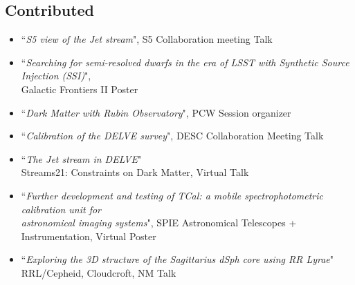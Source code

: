 \documentclass[11pt,letterpaper, sans]{moderncv}        %
\begin{document}
\subsection{Contributed}
\begin{itemize} [itemsep=1pt, leftmargin=28pt] %
\item [2026] ``\textit{S5 view of the Jet stream}", S5 Collaboration meeting \hfill Talk
\item [2025] ``\textit{Searching for semi-resolved dwarfs in the era of LSST with Synthetic Source Injection (SSI)}", \\Galactic Frontiers II \hfill Poster
\item [2023] ``\textit{Dark Matter with Rubin Observatory}", PCW \hfill Session organizer
\item [2022] ``\textit{Calibration of the DELVE survey}", DESC Collaboration Meeting \hfill Talk

\item[2021] ``\textit{The Jet stream in DELVE}" \\
Streams21: Constraints on Dark Matter, Virtual \hfill Talk

\item[2020] ``\textit{Further development and testing of TCal: a mobile spectrophotometric calibration unit for\\ astronomical imaging systems}", 
SPIE Astronomical Telescopes + Instrumentation, Virtual \hfill Poster

\item[2019] ``\textit{Exploring the 3D structure of the Sagittarius dSph core using RR Lyrae}"\\
RRL/Cepheid, Cloudcroft, NM  \hfill Talk
 



\end{itemize}
\end{document}
